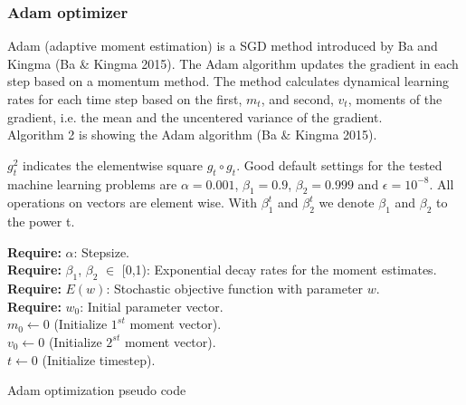 \documentclass[11pt, letterpaper]{amsart}
\begin{document}
\subsubsection{Adam optimizer}
Adam (adaptive moment estimation) is a SGD method introduced by Ba and Kingma (Ba \& Kingma 2015). The Adam algorithm updates the gradient in each step based on a momentum method. The method calculates dynamical learning rates for each time step based on the first, $m_t$, and second, $v_t$, moments of the gradient, i.e. the mean and the uncentered variance of the gradient.
\\

Algorithm 2 is showing the Adam algorithm (Ba $\&$ Kingma 2015).
\newpage

$g_t^2$ indicates the elementwise square $g_t \circ g_t$. Good default settings for the tested machine learning problems are $\alpha = 0.001$, $\beta_1 = 0.9$, $\beta_2 = 0.999$ and $\epsilon = 10^{-8}$. All operations on vectors are element wise. With $\beta_1^t$ and $\beta_2^t$ we denote $\beta_1$ and $\beta_2$ to the power t.
\\

\begin{algorithm}[H]
 
 \textbf{Require:} $\alpha$: Stepsize.
 \\
 \textbf{Require:} $\beta_1$, $\beta_2$ $\in$ [0,1): Exponential decay rates for the moment estimates.
 \\
 \textbf{Require:} $E(w)$: Stochastic objective function with parameter $w$.
 \\
 \textbf{Require:} $w_0$: Initial parameter vector.
 \\
 $m_0 \leftarrow 0$ (Initialize $1^{st}$ moment vector).
 \\
 $v_0 \leftarrow 0$ (Initialize $2^{st}$ moment vector).
 \\
 $t \leftarrow 0$ (Initialize timestep).


 
 \caption{Adam optimization pseudo code}
\end{algorithm}
\vspace{0.5cm}
\end{document}
